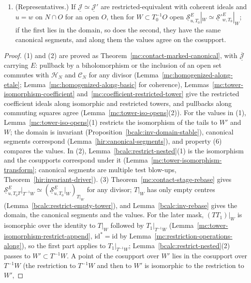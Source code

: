 \begin{theorem}
\begin{enumerate}
\(\underline{\mathcal S}^E_{u,T_0}|_W\) along \((TT_1)|_W\) at the same point.
\item (Representatives.) If \(\underline{\mathcal J}\simeq\underline{\mathcal J}'\) are restricted-equivalent with coherent ideals and \(u=w\) on \(N\cap O\) for an open \(O\), then for
\(W\subset T_0^{-1}O\) open \(\underline{\mathcal S}^E_{u,T_0}|_W\simeq\underline{\mathcal S}'^E_{w,T_0}|_W\); if the first lies in the domain, so does the second, they have the same
canonical segments, and along them the values agree on the cosupport.
\end{enumerate}
\end{theorem}
\begin{proof}
\leanok
(1) and (2) are proved as Theorem~\ref{mc:contact-marked-canonical}, with \(\overline{\underline{\mathcal J}}\) carrying \(E\): pullback by a biholomorphism or the inclusion of
an open set commutes with \(\mathcal H_N\) and \(\mathcal C_N\) for any divisor (Lemma~\ref{mc:homogenized-along-etale}; Lemma~\ref{mc:homogenized-along-basic} for coherence),
Lemmas~\ref{mc:tower-isomorphism-coefficient} and~\ref{mc:coefficient-restricted-tower} give the restricted coefficient ideals along isomorphic and restricted towers, and
pullbacks along commuting squares agree (Lemma~\ref{mc:tower-iso-opens}(2)). For the values in (1), Lemma~\ref{mc:tower-iso-opens}(1) restricts the isomorphism of the
tails to \(W'\) and \(W\); the domain is invariant (Proposition~\ref{bcalc:inv-domain-stable}), canonical segments correspond (Lemma~\ref{hir:canonical-segments}), and property (6)
compares the values. In (2), Lemma~\ref{bcalc:restrict-nested}(1) is the isomorphism and the cosupports correspond under it (Lemma~\ref{mc:tower-isomorphism-transform}; canonical
segments are multiple test blow-ups, Theorem~\ref{hir:invariant-driver}).
(3) Theorem~\ref{mc:contact-stage-rebase} gives \(\underline{\mathcal S}^E_{u,T_0T}|_{T^{-1}W}\simeq(\underline{\mathcal S}^E_{u,T_0}|_W)_{T|_W}\) for any divisor; \(T|_W\) has only empty
centres (Lemma~\ref{bcalc:restrict-empty-tower}), and Lemma~\ref{bcalc:inv-rebase} gives the domain, the canonical segments and the values. For the later mask, \((TT_1)|_W\) is
isomorphic over the identity to \(T|_W\) followed by \(T_1|_{T^{-1}W}\) (Lemma~\ref{mc:tower-isomorphism-restrict-append}, \(\mathrm{id}^*=\mathrm{id}\) by
Lemma~\ref{mc:restriction-operations-along}), so the first part applies to \(T_1|_{T^{-1}W}\); Lemma~\ref{bcalc:restrict-nested}(2) passes to \(W'\subset T^{-1}W\). A point of the
cosupport over \(W'\) lies in the cosupport over \(T^{-1}W\) (the restriction to \(T^{-1}W\) and then to \(W'\) is isomorphic to the restriction to \(W'\),

\end{proof}
